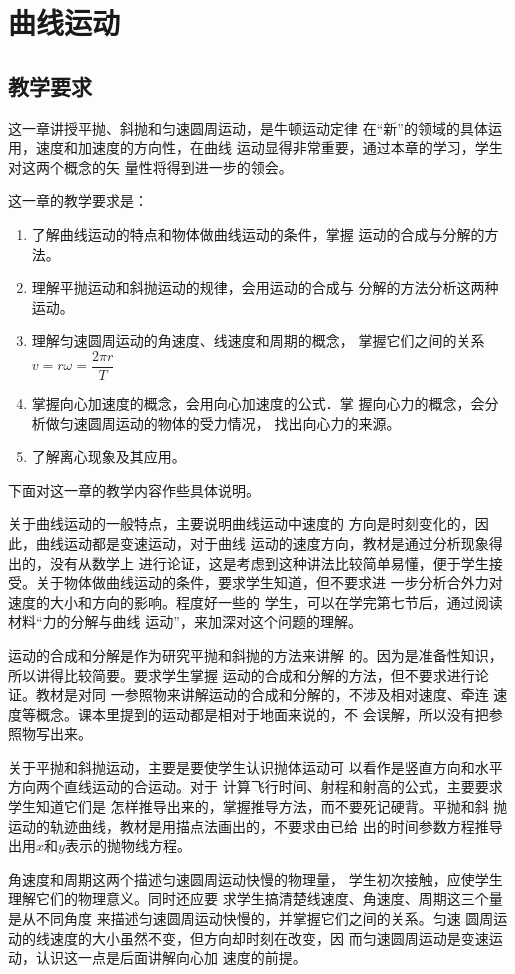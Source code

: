 
\chapter{曲线运动}
\section{教学要求}
这一章讲授平抛、斜抛和匀速圆周运动，是牛顿运动定律
在“新”的领域的具体运用，速度和加速度的方向性，在曲线
运动显得非常重要，通过本章的学习，学生对这两个概念的矢
量性将得到进一步的领会。

这一章的教学要求是：
\begin{enumerate}
\item 了解曲线运动的特点和物体做曲线运动的条件，掌握
运动的合成与分解的方法。
\item 理解平抛运动和斜抛运动的规律，会用运动的合成与
分解的方法分析这两种运动。
\item 理解匀速圆周运动的角速度、线速度和周期的概念，
掌握它们之间的关系$v=r\omega=\dfrac{2\pi r}{T}$
\item 掌握向心加速度的概念，会用向心加速度的公式．掌
握向心力的概念，会分析做匀速圆周运动的物体的受力情况，
找出向心力的来源。
\item 了解离心现象及其应用。
\end{enumerate}

下面对这一章的教学内容作些具体说明。

关于曲线运动的一般特点，主要说明曲线运动中速度的
方向是时刻变化的，因此，曲线运动都是变速运动，对于曲线
运动的速度方向，教材是通过分析现象得出的，没有从数学上
进行论证，这是考虑到这种讲法比较简单易懂，便于学生接
受。关于物体做曲线运动的条件，要求学生知道，但不要求进
一步分析合外力对速度的大小和方向的影响。程度好一些的
学生，可以在学完第七节后，通过阅读材料“力的分解与曲线
运动”，来加深对这个问题的理解。

运动的合成和分解是作为研究平抛和斜抛的方法来讲解
的。因为是准备性知识，所以讲得比较简要。要求学生掌握
运动的合成和分解的方法，但不要求进行论证。教材是对同
一参照物来讲解运动的合成和分解的，不涉及相对速度、牵连
速度等概念。课本里提到的运动都是相对于地面来说的，不
会误解，所以没有把参照物写出来。

关于平抛和斜抛运动，主要是要使学生认识抛体运动可
以看作是竖直方向和水平方向两个直线运动的合运动。对于
计算飞行时间、射程和射高的公式，主要要求学生知道它们是
怎样推导出来的，掌握推导方法，而不要死记硬背。平抛和斜
抛运动的轨迹曲线，教材是用描点法画出的，不要求由已给
出的时间参数方程推导出用$x$和$y$表示的抛物线方程。

角速度和周期这两个描述匀速圆周运动快慢的物理量，
学生初次接触，应使学生理解它们的物理意义。同时还应要
求学生搞清楚线速度、角速度、周期这三个量是从不同角度
来描述匀速圆周运动快慢的，并掌握它们之间的关系。匀速
圆周运动的线速度的大小虽然不变，但方向却时刻在改变，因
而匀速圆周运动是变速运动，认识这一点是后面讲解向心加
速度的前提。

